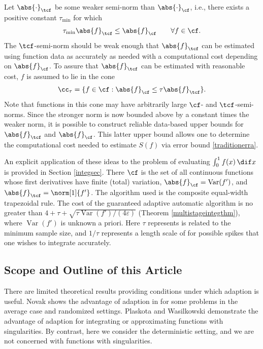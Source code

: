 \documentclass[]{elsarticle}
\DeclareMathOperator{\Var}{Var}
\theoremstyle{definition}
\theoremstyle{remark}
\newcommand{\Fnorm}[1]{\abs{#1}_{\cf}}
\newcommand{\Ftnorm}[1]{\abs{#1}_{\tcf}}
\begin{document}
Let $\Ftnorm{\cdot}$ be some weaker semi-norm than $\Fnorm{\cdot}$, i.e., there exists a positive constant $\tau_{\min}$ for which 
\begin{equation} \label{Fspacecondstrong}
\tau_{\min} \Ftnorm{f} \le \Fnorm{f} \qquad \forall f \in \cf.
\end{equation}
The $\tcf$-semi-norm should be weak enough that $\Ftnorm{f}$ can be estimated using function data as accurately as needed with a computational cost depending on $\Fnorm{f}$.  To assure that $\Ftnorm{f}$ can be estimated with reasonable cost, $f$ is assumed to lie in the cone 
\begin{equation} \label{conedef}
\cc_{\tau}=\{f \in \cf : \Fnorm{f} \le \tau \Ftnorm{f} \}.
\end{equation}
Note that functions in this cone may have arbitrarily large $\cf$- and $\tcf$-semi-norms.  Since the stronger norm is now bounded above by a constant times the weaker norm, it is possible to construct reliable data-based upper bounds for $\Ftnorm{f}$ and $\Fnorm{f}$.  This latter upper bound allows one to determine the computational cost needed to estimate $S(f)$ via error bound \eqref{traditionerra}.

An explicit application of these ideas to the problem of evaluating $\int_0^1 f(x) \, \dif x$ is provided in Section \ref{integsec}.  There $\cf$ is the set of all continuous functions whose first derivatives have finite (total) variation, $\Fnorm{f}=\Var(f')$, and $\Ftnorm{f}=\norm[1]{f'}$.  The algorithm used is the composite equal-width trapezoidal rule.  The cost of the guaranteed adaptive automatic algorithm is no greater than $4+ \tau + \sqrt{\tau \Var(f')/(4\varepsilon)}$ (Theorem \ref{multistageintegthm}), where $\Var(f')$ is unknown a priori. Here $\tau$ represents is related to the minimum sample size, and $1/\tau$ represents a length scale of for possible spikes that one wishes to integrate accurately.

\subsection{Scope and Outline of this Article} 
There are limited theoretical results providing conditions under which adaption is useful.  Novak \cite{Nov96a} shows the advantage of adaption in for some problems in the average case and randomized settings.  Plaskota and Wasilkowski \cite{PlaWas05a,PlaEtal08a} demonstrate the advantage of adaption for integrating or approximating functions with singularities. By contrast, here we consider the deterministic setting, and we are not concerned with functions with singularities.
\end{document}
